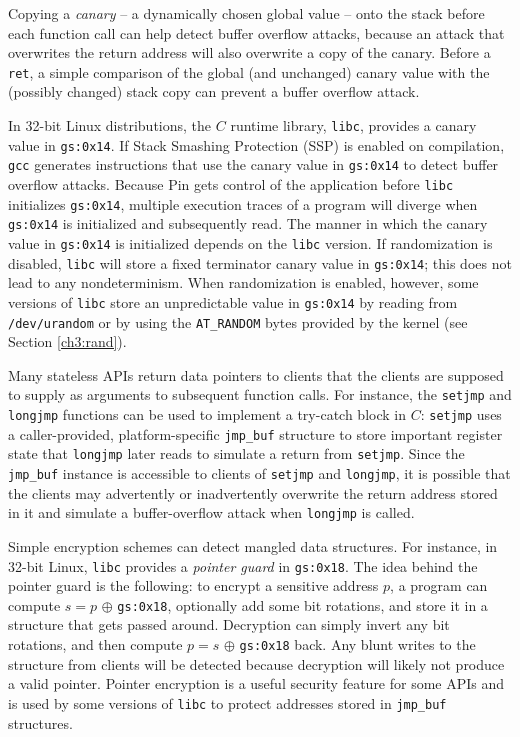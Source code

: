 \newline
Copying a \emph{canary} -- a dynamically chosen global value -- onto the
stack before each function call can help detect buffer overflow attacks, because 
an attack that overwrites the return address will also overwrite
a copy of the canary. Before a \texttt{ret}, a simple comparison 
of the global (and unchanged) canary
value with the (possibly changed) stack copy can prevent a buffer overflow attack.

In 32-bit Linux distributions, the $C$ runtime library, 
\texttt{libc}, provides a canary value in \texttt{gs:0x14}.
If Stack Smashing Protection (SSP) is enabled on compilation,
\texttt{gcc} generates instructions that use the canary value
in \texttt{gs:0x14} to detect buffer overflow attacks.
Because Pin gets control of the application before \texttt{libc}
initializes \texttt{gs:0x14}, multiple execution traces of a program
will diverge when \texttt{gs:0x14} is initialized and subsequently
read.  The manner in which the canary value in \texttt{gs:0x14} is initialized
depends on the \texttt{libc} version.
If randomization is disabled, \texttt{libc} will store a fixed
terminator canary value in \texttt{gs:0x14}; this does not lead to any nondeterminism.
When randomization is enabled, however,  
some versions of \texttt{libc} store an unpredictable value in \texttt{gs:0x14} 
by reading from \texttt{/dev/urandom}
or by using the \texttt{AT\_RANDOM} bytes provided by the kernel (see
Section \ref{ch3:rand}). \newline

 \newline
Many stateless APIs return data pointers to clients 
that the clients are supposed to supply as arguments
to subsequent function calls. 
For instance, the \texttt{setjmp} and \texttt{longjmp} functions
can be used to implement a try-catch block in $C$: \texttt{setjmp} uses 
a caller-provided, platform-specific \texttt{jmp\_buf} structure
to store important register state that \texttt{longjmp} 
later reads to simulate a return from \texttt{setjmp}.
Since the \texttt{jmp\_buf} instance is accessible to clients of \texttt{setjmp}
and \texttt{longjmp}, it is possible that the clients may advertently or inadvertently
overwrite the return address stored in it and simulate a buffer-overflow attack
when \texttt{longjmp} is called.

Simple encryption schemes can detect mangled data structures.
For instance, in 32-bit Linux, \texttt{libc} provides
a {\em pointer guard}  in \texttt{gs:0x18}. 
The idea behind the pointer guard is the following: 
to encrypt a sensitive address $p$, a program
can compute $s = p$  $\oplus  $ \texttt{gs:0x18}, 
optionally add some bit rotations, and store it in a structure
that gets passed around. Decryption can simply invert any bit rotations, 
and then compute $p = s$ $\oplus  $ \texttt{gs:0x18} back. 
Any blunt writes to the structure from clients will be detected because
decryption will likely not produce a valid pointer. 
Pointer encryption is a useful security feature for some APIs
and is used by some versions of \texttt{libc} to protect addresses stored in \texttt{jmp\_buf}
structures.

